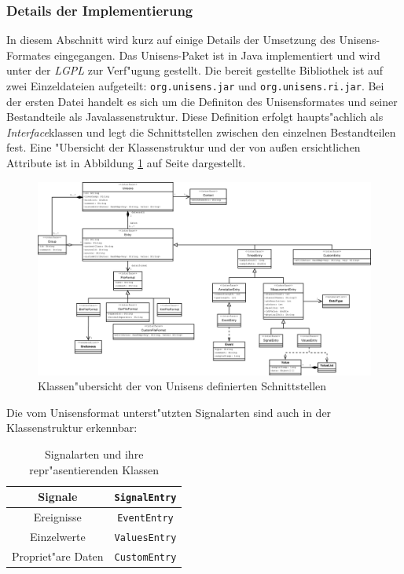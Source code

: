 \subsubsection{Details der Implementierung}

In diesem Abschnitt wird kurz auf einige Details der Umsetzung des Unisens-Formates eingegangen.
Das Unisens-Paket ist in Java implementiert und wird unter der \emph{\ac{LGPL}} zur Verf"ugung gestellt.
Die bereit gestellte Bibliothek ist auf zwei Einzeldateien aufgeteilt: \verb|org.unisens.jar| und \verb|org.unisens.ri.jar|.
Bei der ersten Datei handelt es sich um die Definiton des Unisensformates und seiner Bestandteile als Javalassenstruktur.
Diese Definition erfolgt haupts"achlich als \emph{Interface}klassen und legt die Schnittstellen zwischen den einzelnen Bestandteilen fest.
Eine "Ubersicht der Klassenstruktur und der von au\ss en ersichtlichen Attribute ist in Abbildung \ref{pic:unisens_interface} auf Seite \pageref{pic:unisens_interface} dargestellt.
\begin{figure}
\includegraphics[width=\textwidth]{bilder/unisens_interface_.eps}
\caption{Klassen"ubersicht der von Unisens definierten Schnittstellen}
\label{pic:unisens_interface}
\end{figure}
Die vom Unisensformat unterst"utzten Signalarten sind auch in der Klassenstruktur erkennbar:
\begin{table}[h]
\centering
\begin{tabular}{|c|c|}
	\hline Signale & \verb|SignalEntry| \\
	\hline Ereignisse & \verb|EventEntry| \\
	\hline Einzelwerte & \verb|ValuesEntry| \\
	\hline Propriet"are Daten & \verb|CustomEntry| \\
	\hline
\end{tabular}
\caption{Signalarten und ihre repr"asentierenden Klassen}
\label{tab:signal_klassen}
\end{table}

